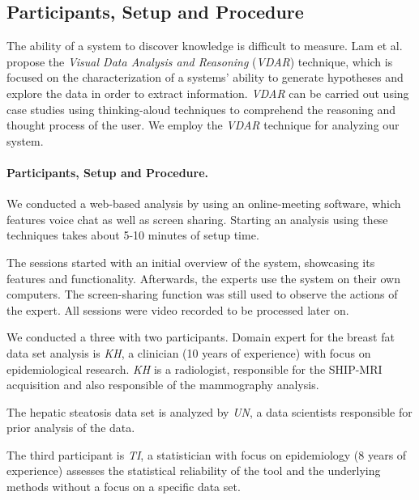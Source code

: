 \documentclass[journal]{style/vgtc} 			          %
\begin{document}
\subsection{Participants, Setup and Procedure}
The ability of a system to discover knowledge is difficult to measure.
Lam et al. \cite{Lam2012} propose the \emph{Visual Data Analysis and Reasoning} (\emph{VDAR}) technique, which is focused on the characterization of a systems' ability to generate hypotheses and explore the data in order to extract information.
\emph{VDAR} can be carried out using case studies using thinking-aloud techniques to comprehend the reasoning and thought process of the user.
%
We employ the \emph{VDAR} technique for analyzing our system.
\paragraph{Participants, Setup and Procedure.}
We conducted a web-based analysis by using an online-meeting software, which features voice chat as well as screen sharing.
Starting an analysis using these techniques takes about 5-10 minutes of setup time.

The sessions started with an initial overview of the system, showcasing its features and functionality.
Afterwards, the experts use the system on their own computers.
The screen-sharing function was still used to observe the actions of the expert.
All sessions were video recorded to be processed later on.

We conducted a three with two participants. %
Domain expert for the breast fat data set analysis is \emph{KH}, a clinician (10 years of experience) with focus on epidemiological research.
\emph{KH} is a radiologist, responsible for the SHIP-MRI acquisition and also responsible of the mammography analysis.

The hepatic steatosis data set is analyzed by \emph{UN}, a data scientists responsible for prior analysis of the data.

The third participant is \emph{TI}, a statistician with focus on epidemiology (8 years of experience) assesses the statistical reliability of the tool and the underlying methods without a focus on a specific data set.
\end{document}
